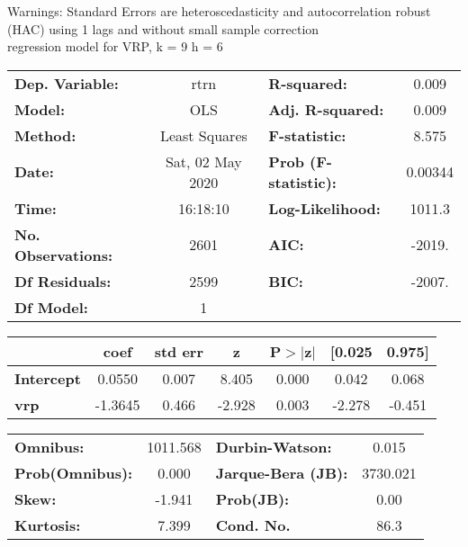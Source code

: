 Warnings: \newline
 [1] Standard Errors are heteroscedasticity and autocorrelation robust (HAC) using 1 lags and without small sample correction\\ 

regression model for VRP, k = 9 h = 6\begin{center}
\begin{tabular}{lclc}
\toprule
\textbf{Dep. Variable:}    &       rtrn       & \textbf{  R-squared:         } &     0.009   \\
\textbf{Model:}            &       OLS        & \textbf{  Adj. R-squared:    } &     0.009   \\
\textbf{Method:}           &  Least Squares   & \textbf{  F-statistic:       } &     8.575   \\
\textbf{Date:}             & Sat, 02 May 2020 & \textbf{  Prob (F-statistic):} &  0.00344    \\
\textbf{Time:}             &     16:18:10     & \textbf{  Log-Likelihood:    } &    1011.3   \\
\textbf{No. Observations:} &        2601      & \textbf{  AIC:               } &    -2019.   \\
\textbf{Df Residuals:}     &        2599      & \textbf{  BIC:               } &    -2007.   \\
\textbf{Df Model:}         &           1      & \textbf{                     } &             \\
\bottomrule
\end{tabular}
\begin{tabular}{lcccccc}
                   & \textbf{coef} & \textbf{std err} & \textbf{z} & \textbf{P$> |$z$|$} & \textbf{[0.025} & \textbf{0.975]}  \\
\midrule
\textbf{Intercept} &       0.0550  &        0.007     &     8.405  &         0.000        &        0.042    &        0.068     \\
\textbf{vrp}       &      -1.3645  &        0.466     &    -2.928  &         0.003        &       -2.278    &       -0.451     \\
\bottomrule
\end{tabular}
\begin{tabular}{lclc}
\textbf{Omnibus:}       & 1011.568 & \textbf{  Durbin-Watson:     } &    0.015  \\
\textbf{Prob(Omnibus):} &   0.000  & \textbf{  Jarque-Bera (JB):  } & 3730.021  \\
\textbf{Skew:}          &  -1.941  & \textbf{  Prob(JB):          } &     0.00  \\
\textbf{Kurtosis:}      &   7.399  & \textbf{  Cond. No.          } &     86.3  \\
\bottomrule
\end{tabular}
\end{center}

